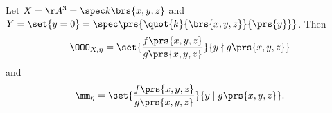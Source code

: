 \documentclass[10pt,a4paper,twoside,openany,hidelinks]{book}
\begin{document}
\begin{example}
Let $X = \AA^3 = \spec k\brs{x,y,z}$ and $Y = \set{y = 0} = \spec \prs{\quot{k}{\brs{x,y,z}}{\prs{y}}}$.
Then
\[\OOO_{X,\eta} = \set{\frac{f\prs{x,y,z}}{g\prs{x,y,z}}}{y \nmid g\prs{x,y,z}}\]
and
\[\mm_\eta = \set{\frac{f\prs{x,y,z}}{g\prs{x,y,z}}}{y \mid g\prs{x,y,z}} \text{.}\]
\end{example}

\backmatter
\end{document}
